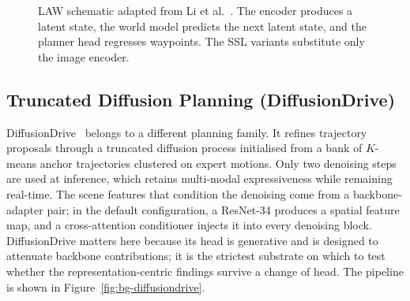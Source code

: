 \begin{figure}[ht]
    \centering
    \caption[LAW schematic.]{LAW schematic adapted from Li et al.~\cite{li-law-2024}. The encoder produces a latent state, the world model predicts the next latent state, and the planner head regresses waypoints. The SSL variants substitute only the image encoder.}
    \label{fig:bg-law}
\end{figure}

\subsection{Truncated Diffusion Planning (DiffusionDrive)}
\label{sec:bg-diffusiondrive}

DiffusionDrive~\cite{jia-diffusiondrive-2025} belongs to a different planning family. It refines trajectory proposals through a truncated diffusion process initialised from a bank of $K$-means anchor trajectories clustered on expert motions. Only two denoising steps are used at inference, which retains multi-modal expressiveness while remaining real-time. The scene features that condition the denoising come from a backbone-adapter pair; in the default configuration, a ResNet-34 produces a spatial feature map, and a cross-attention conditioner injects it into every denoising block. DiffusionDrive matters here because its head is generative and is designed to attenuate backbone contributions; it is the strictest substrate on which to test whether the representation-centric findings survive a change of head. The pipeline is shown in Figure~\ref{fig:bg-diffusiondrive}.

